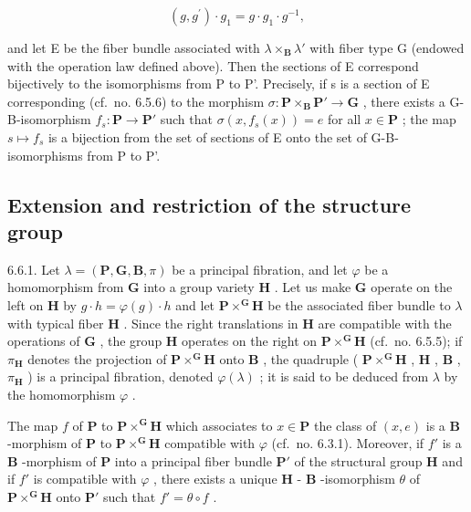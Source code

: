 \[
(g, g ^ {\prime}) \cdot g _ {1} = g \cdot g _ {1} \cdot g ^ {- 1},
\]

and let E be the fiber bundle associated with \(\lambda \times_{\mathbf{B}} \lambda'\) with fiber type G (endowed with the operation law defined above). Then the sections of E correspond bijectively to the isomorphisms from P to P'. Precisely, if s is a section of E corresponding (cf.~no. 6.5.6) to the morphism \(\sigma: \mathbf{P} \times_{\mathbf{B}} \mathbf{P}' \to \mathbf{G}\) , there exists a G-B-isomorphism \(f_s: \mathbf{P} \to \mathbf{P}'\) such that \(\sigma(x, f_s(x)) = e\) for all \(x \in \mathbf{P}\) ; the map \(s \mapsto f_s\) is a bijection from the set of sections of E onto the set of G-B-isomorphisms from P to P'.

\subsection{Extension and restriction of the structure group}

6.6.1. Let \(\lambda = (\mathbf{P}, \mathbf{G}, \mathbf{B}, \pi)\) be a principal fibration, and let \(\varphi\) be a homomorphism from \(\mathbf{G}\) into a group variety \(\mathbf{H}\) . Let us make \(\mathbf{G}\) operate on the left on \(\mathbf{H}\) by \(g \cdot h = \varphi(g) \cdot h\) and let \(\mathbf{P} \times^{\mathbf{G}} \mathbf{H}\) be the associated fiber bundle to \(\lambda\) with typical fiber \(\mathbf{H}\) . Since the right translations in \(\mathbf{H}\) are compatible with the operations of \(\mathbf{G}\) , the group \(\mathbf{H}\) operates on the right on \(\mathbf{P} \times^{\mathbf{G}} \mathbf{H}\) (cf.~no. 6.5.5); if \(\pi_{\mathbf{H}}\) denotes the projection of \(\mathbf{P} \times^{\mathbf{G}} \mathbf{H}\) onto \(\mathbf{B}\) , the quadruple ( \(\mathbf{P} \times^{\mathbf{G}} \mathbf{H}\) , \(\mathbf{H}\) , \(\mathbf{B}\) , \(\pi_{\mathbf{H}}\) ) is a principal fibration, denoted \(\varphi(\lambda)\) ; it is said to be deduced from \(\lambda\) by the homomorphism \(\varphi\) .

The map \(f\) of \(\mathbf{P}\) to \(\mathbf{P} \times^{\mathbf{G}}\mathbf{H}\) which associates to \(x \in \mathbf{P}\) the class of \((x, e)\) is a \(\mathbf{B}\) -morphism of \(\mathbf{P}\) to \(\mathbf{P} \times^{\mathbf{G}}\mathbf{H}\) compatible with \(\varphi\) (cf.~no. 6.3.1). Moreover, if \(f'\) is a \(\mathbf{B}\) -morphism of \(\mathbf{P}\) into a principal fiber bundle \(\mathbf{P}'\) of the structural group \(\mathbf{H}\) and if \(f'\) is compatible with \(\varphi\) , there exists a unique \(\mathbf{H}\) - \(\mathbf{B}\) -isomorphism \(\theta\) of \(\mathbf{P} \times^{\mathbf{G}}\mathbf{H}\) onto \(\mathbf{P}'\) such that \(f' = \theta \circ f\) .

